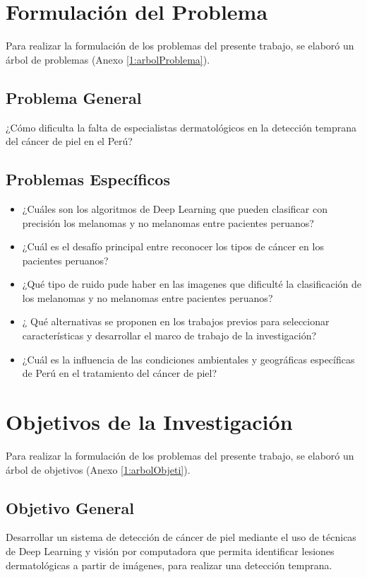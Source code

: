 \section{Formulación del Problema}

Para realizar la formulación de los problemas del presente trabajo, se elaboró un árbol de problemas (Anexo \ref{1:arbolProblema}).

\subsection{Problema General}
\newcommand{\ProblemaGeneral}{¿Cómo dificulta la falta de especialistas dermatológicos en la detección temprana del cáncer de piel en el Perú?
}
\ProblemaGeneral
\subsection{Problemas Espec\'{i}ficos}
\newcommand{\Pbone}{
¿Cuáles son los algoritmos de Deep Learning que pueden clasificar con precisión los melanomas y no melanomas entre pacientes peruanos?
}
\newcommand{\Pbtwo}{
¿Cuál es el desafío principal entre reconocer los tipos de cáncer en los pacientes peruanos?
}
\newcommand{\Pbthree}{
¿Qué tipo de ruido pude haber en las imagenes que dificulté la clasificación de los melanomas y no melanomas entre pacientes peruanos?
}
\newcommand{\Pbfour}{
¿ Qué alternativas se proponen en los trabajos previos para seleccionar características y desarrollar el marco de trabajo de la investigación?
}
\newcommand{\Pbfive}{
¿Cuál es la influencia de las condiciones ambientales y geográficas específicas de Perú en el tratamiento del cáncer de piel?
}

\begin{itemize}
	\item \Pbone
	\item \Pbtwo
	\item \Pbthree
	\item \Pbfour
	\item \Pbfive
\end{itemize}

\section{Objetivos de la Investigación}

Para realizar la formulación de los problemas del presente trabajo, se elaboró un árbol de objetivos (Anexo \ref{1:arbolObjeti}).


\subsection{Objetivo General}
\newcommand{\ObjetivoGeneral}{
Desarrollar un sistema de detección de cáncer de piel mediante el uso de técnicas de Deep Learning y visión por computadora que permita identificar lesiones dermatológicas a partir de imágenes, para realizar una detección temprana.


}
\ObjetivoGeneral
